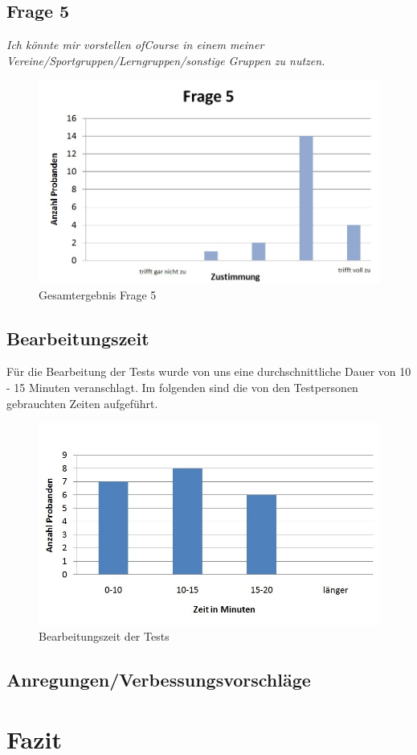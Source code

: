 \subsection{Frage 5}
\begin{center}
	{\it Ich könnte mir vorstellen ofCourse in einem meiner Vereine/Sportgruppen/Lerngruppen/sonstige Gruppen zu nutzen.}
\end{center}
\begin{figure}[h]
\centering
\includegraphics[width=0.7\linewidth]{img/Frage5}
\caption{Gesamtergebnis Frage 5}
\label{fig:Frage5}
\end{figure}


\subsection{Bearbeitungszeit}
Für die Bearbeitung der Tests wurde von uns eine durchschnittliche Dauer von 10 - 15 Minuten veranschlagt. Im folgenden sind die 
von den Testpersonen gebrauchten Zeiten aufgeführt.

\begin{figure}[h]
\centering
\includegraphics[width=0.7\linewidth]{img/Gesamtzeit}
\caption{Bearbeitungszeit der Tests}
\label{fig:Gesamtzeit}
\end{figure}


\subsection{Anregungen/Verbessungsvorschläge}

\section{Fazit}